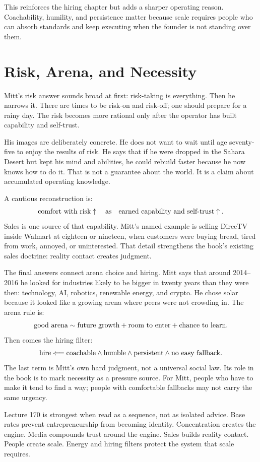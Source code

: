 \documentclass[11pt,oneside]{book}
\begin{document}
This reinforces the hiring chapter but adds a sharper operating reason. Coachability, humility, and persistence matter because scale requires people who can absorb standards and keep executing when the founder is not standing over them.

\section{Risk, Arena, and Necessity}

Mitt's risk answer sounds broad at first: risk-taking is everything. Then he narrows it. There are times to be risk-on and risk-off; one should prepare for a rainy day. The risk becomes more rational only after the operator has built capability and self-trust.

His images are deliberately concrete. He does not want to wait until age seventy-five to enjoy the results of risk. He says that if he were dropped in the Sahara Desert but kept his mind and abilities, he could rebuild faster because he now knows how to do it. That is not a guarantee about the world. It is a claim about accumulated operating knowledge.

A cautious reconstruction is:
\[
\hbox{comfort with risk}
\uparrow
\quad\hbox{as}\quad
\hbox{earned capability and self-trust}
\uparrow.
\]
Sales is one source of that capability. Mitt's named example is selling DirecTV inside Walmart at eighteen or nineteen, when customers were buying bread, tired from work, annoyed, or uninterested. That detail strengthens the book's existing sales doctrine: reality contact creates judgment.

The final answers connect arena choice and hiring. Mitt says that around 2014--2016 he looked for industries likely to be bigger in twenty years than they were then: technology, AI, robotics, renewable energy, and crypto. He chose solar because it looked like a growing arena where peers were not crowding in. The arena rule is:
\[
\hbox{good arena}
\sim
\hbox{future growth}
+
\hbox{room to enter}
+
\hbox{chance to learn}.
\]
Then comes the hiring filter:
\[
\hbox{hire}
\Longleftarrow
\hbox{coachable}
\wedge
\hbox{humble}
\wedge
\hbox{persistent}
\wedge
\hbox{no easy fallback}.
\]
The last term is Mitt's own hard judgment, not a universal social law. Its role in the book is to mark necessity as a pressure source. For Mitt, people who have to make it tend to find a way; people with comfortable fallbacks may not carry the same urgency.

\begin{remark}
Lecture 170 is strongest when read as a sequence, not as isolated advice. Base rates prevent entrepreneurship from becoming identity. Concentration creates the engine. Media compounds trust around the engine. Sales builds reality contact. People create scale. Energy and hiring filters protect the system that scale requires.
\end{remark}
\end{document}
